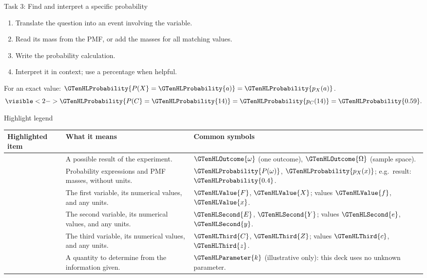 \documentclass[12pt,aspectratio=169]{beamer}
\makeatletter
\renewcommand{\arraystretch}{1.22}
\newcommand{\LessonHighlightLegend}{%
  \begingroup
  \small
  \setlength{\tabcolsep}{4pt}
  \renewcommand{\arraystretch}{1.0}
  \begin{tabularx}{\linewidth}{@{}>{\raggedright\arraybackslash}p{.255\linewidth}%
    >{\raggedright\arraybackslash}X>{\raggedright\arraybackslash}p{.34\linewidth}@{}}
    \toprule
    \textbf{Highlighted item} & \textbf{What it means} & \textbf{Common symbols} \\
    \midrule
    \GTenHLOutcome{Outcome} & A possible result of the experiment. &
      $\GTenHLOutcome{\omega}$ (one outcome),\newline
      $\GTenHLOutcome{\Omega}$ (sample space). \\
    \GTenHLProbability{Probability} & Probability expressions and PMF masses, without units. &
      $\GTenHLProbability{P(\omega)}$, $\GTenHLProbability{p_X(x)}$;\newline
      e.g.\ result: $\GTenHLProbability{0.4}$. \\
    \GTenHLValue{First variable} & The first variable, its numerical values, and any units. &
      $\GTenHLValue{F}$, $\GTenHLValue{X}$; values $\GTenHLValue{f}$, $\GTenHLValue{x}$. \\
    \GTenHLSecond{Second variable} & The second variable, its numerical values, and any units. &
      $\GTenHLSecond{E}$, $\GTenHLSecond{Y}$; values $\GTenHLSecond{e}$, $\GTenHLSecond{y}$. \\
    \GTenHLThird{Third variable} & The third variable, its numerical values, and any units. &
      $\GTenHLThird{C}$, $\GTenHLThird{Z}$; values $\GTenHLThird{c}$, $\GTenHLThird{z}$. \\
    \GTenHLParameter{Unknown parameter} & A quantity to determine from the information given. &
      $\GTenHLParameter{k}$ (illustrative only): this deck uses no unknown parameter. \\
    \bottomrule
  \end{tabularx}\par
  \endgroup
}
\makeatother
\begin{document}
\begin{frame}[t]{Task 3: Find and interpret a specific probability}
  \begin{enumerate}
    \item Translate the question into an event involving the variable.
    \item Read its mass from the PMF, or add the masses for all matching values.
    \item Write the probability calculation.
    \item Interpret it in context; use a percentage when helpful.
  \end{enumerate}
  For an exact value: $\GTenHLProbability{P(X}=\GTenHLProbability{a)}=\GTenHLProbability{p_X(a)}$.
  \[
    \visible<2->{\GTenHLProbability{P(C}=\GTenHLProbability{14)}
      =\GTenHLProbability{p_C(14)}=\GTenHLProbability{0.59}.}
  \]

  \medskip
\end{frame}

\begin{frame}[t]{Highlight legend}
  \LessonHighlightLegend
\end{frame}
\end{document}
